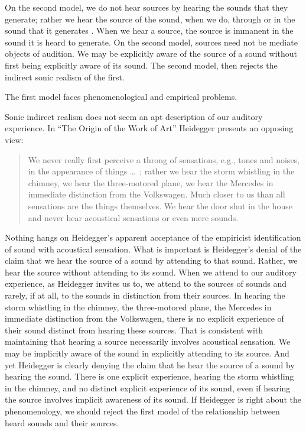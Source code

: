 \documentclass[12pt]{article}
\begin{document}
On the second model, we do not hear sources by hearing the sounds that they generate; rather we hear the source of the sound, when we do, through or in the sound that it generates \citep{Leddington:2014aa}. When we hear a source, the source is immanent in the sound it is heard to generate. On the second model, sources need not be mediate objects of audition. We may be explicitly aware of the source of a sound without first being explicitly aware of its sound. The second model, then rejects the indirect sonic realism of the first.

The first model faces phenomenological and empirical problems.

Sonic indirect realism does not seem an apt description of our auditory experience. In ``The Origin of the Work of Art'' Heidegger presents an opposing view:
\begin{quote}
	We never really first perceive a throng of sensations, e.g., tones and noises, in the appearance of things \ldots\ ; rather we hear the storm whistling in the chimney, we hear the three-motored plane, we hear the Mercedes in immediate distinction from the Volkswagen. Much closer to us than all sensations are the things themselves. We hear the door shut in the house and never hear acoustical sensations or even mere sounds. \citep{Heidegger:1935uq}
\end{quote}
Nothing hangs on Heidegger’s apparent acceptance of the empiricist identification of sound with acoustical sensation. What is important is Heidegger’s denial of the claim that we hear the source of a sound by attending to that sound. Rather, we hear the source without attending to its sound. When we attend to our auditory experience, as Heidegger invites us to, we attend to the sources of sounds and rarely, if at all, to the sounds in distinction from their sources. In hearing the storm whistling in the chimney, the three-motored plane, the Mercedes in immediate distinction from the Volkswagen, there is no explicit experience of their sound distinct from hearing these sources. That is consistent with maintaining that hearing a source necessarily involves acoustical sensation. We may be implicitly aware of the sound in explicitly attending to its source. And yet Heidegger is clearly denying the claim that he hear the source of a sound by hearing the sound. There is one explicit experience, hearing the storm whistling in the chimney, and no distinct explicit experience of its sound, even if hearing the source involves implicit awareness of its sound. If Heidegger is right about the phenomenology, we should reject the first model of the relationship between heard sounds and their sources.
\end{document}
